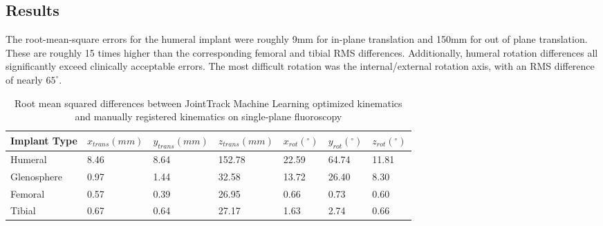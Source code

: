 \subsection{Results}
The root-mean-square errors for the humeral implant were roughly 9mm for in-plane translation and 150mm for out of plane translation.
These are roughly 15 times higher than the corresponding femoral and tibial RMS differences.
Additionally, humeral rotation differences all significantly exceed clinically acceptable errors.
The most difficult rotation was the internal/external rotation axis, with an RMS difference of nearly $65^{\circ}$.
\begin{table}[h!]
	\caption{Root mean squared differences between JointTrack Machine Learning optimized kinematics and manually registered kinematics on single-plane fluoroscopy} \label{tab:jtml-tsa-tka-vals}
	\begin{tabularx}{\linewidth}{V{10cm}XXXXXX}\hline
		 Implant Type & $x_{trans} (mm)$ & $y_{trans} (mm)$ & $z_{trans} (mm)$ & $x_{rot} (^{\circ})$ & $y_{rot} (^{\circ})$ & $z_{rot} (^{\circ})$ \\ \hline
		Humeral            & 8.46             & 8.64             & 152.78           & 22.59                & 64.74                & 11.81                \\
		Glenosphere        & 0.97             & 1.44             & 32.58            & 13.72                & 26.40                & 8.30                 \\
		Femoral            & 0.57             & 0.39             & 26.95            & 0.66                 & 0.73                 & 0.60                 \\
		Tibial             & 0.67             & 0.64             & 27.17            & 1.63                 & 2.74                 & 0.66                 \\\hline
	\end{tabularx}
\end{table}


